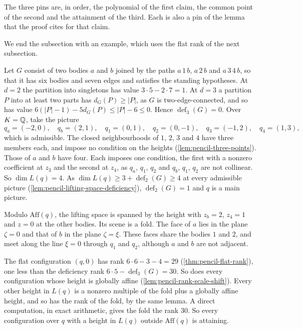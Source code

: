 \begin{fmlnote}
  The three pins are, in order, the polynomial of the first claim, the
  common point of the second and the attainment of the third. Each is
  also a pin of the lemma that the proof cites for that claim.
\end{fmlnote}

We end the subsection with an example, which uses the flat rank of the
next subsection.

\begin{example}
  \label{ex:pencil-theta}
  Let $G$ consist of two bodies $a$ and $b$ joined by the paths
  $a\,1\,b$, $a\,2\,b$ and $a\,3\,4\,b$, so that it has six bodies and
  seven edges and satisfies the standing hypotheses. At $d = 2$ the
  partition into singletons has value $3 \cdot 5 - 2 \cdot 7 = 1$. At
  $d = 3$ a partition $P$ into at least two parts has
  $d_G(P) \ge |P|$, as $G$ is two-edge-connected, and so has value
  $6(|P| - 1) - 5 d_G(P) \le |P| - 6 \le 0$. Hence
  $\operatorname{def}_3(G) = 0$. Over $K = {\mathbb{Q}}$, take the picture
  \[
    q_a = (-2, 0),\quad q_b = (2, 1),\quad q_1 = (0, 1),\quad
    q_2 = (0, -1),\quad q_3 = (-1, 2),\quad q_4 = (1, 3),
  \]
  which is admissible. The closed neighbourhoods of $1$, $2$, $3$ and
  $4$ have three members each, and impose no condition on the heights
  (\cref{lem:pencil-three-points}). Those of $a$ and $b$ have four. Each
  imposes one condition, the first with a nonzero coefficient at $z_3$
  and the second at $z_4$, as $q_a$, $q_1$, $q_2$ and $q_b$, $q_1$,
  $q_2$ are not collinear. So $\dim L(q) = 4$. As
  $\dim L(q) \ge 3 + \operatorname{def}_2(G) \ge 4$ at every admissible
  picture (\cref{lem:pencil-lifting-space-deficiency}),
  $\operatorname{def}_2(G) = 1$ and $q$ is a main picture.

  Modulo $\mathrm{Aff}(q)$, the lifting space is spanned by the height
  with $z_b = 2$, $z_4 = 1$ and $z = 0$ at the other bodies. Its scene
  is a fold. The face of $a$ lies in the plane $\zeta = 0$ and that of
  $b$ in the plane $\zeta = \xi$. These faces share the bodies $1$ and
  $2$, and meet along the line $\xi = 0$ through $q_1$ and $q_2$,
  although $a$ and $b$ are not adjacent.

  The flat configuration $(q, 0)$ has rank $6 \cdot 6 - 3 - 4 = 29$
  (\cref{thm:pencil-flat-rank}), one less than the deficiency rank
  $6 \cdot 5 - \operatorname{def}_3(G) = 30$. So does every configuration
  whose height is globally affine (\cref{lem:pencil-rank-scale-shift}).
  Every other height in $L(q)$ is a nonzero multiple of the fold plus a
  globally affine height, and so has the rank of the fold, by the same
  lemma. A direct computation, in exact arithmetic, gives the fold the
  rank $30$. So every configuration over $q$ with a height in $L(q)$
  outside $\mathrm{Aff}(q)$ is attaining.


\end{example}

